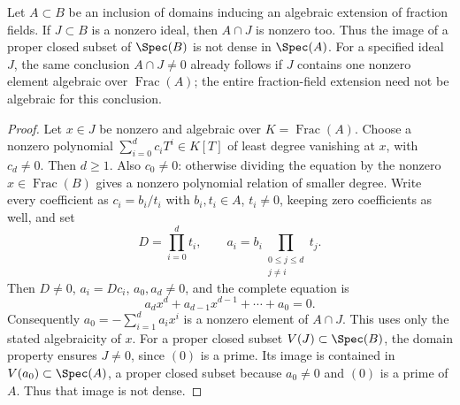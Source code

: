 \begin{lemma}
\label{editorial-source-lemma-intersection-not-zero}
Let $A \subset B$ be an inclusion of domains inducing an algebraic extension
of fraction fields. If $J \subset B$ is a nonzero ideal, then $A \cap J$
is nonzero too. Thus the image of a proper closed subset of $\Spec(B)$
is not dense in $\Spec(A)$.
For a specified ideal $J$, the same conclusion $A\cap J\ne0$ already
follows if $J$ contains one nonzero element algebraic over
$\operatorname{Frac}(A)$; the entire fraction-field extension need
not be algebraic for this conclusion.
\end{lemma}

\begin{proof}
Let $x\in J$ be nonzero and algebraic over $K=\operatorname{Frac}(A)$.
Choose a nonzero polynomial $\sum_{i=0}^dc_iT^i\in K[T]$ of least
degree vanishing at $x$, with $c_d\ne0$. Then $d\geq1$.
Also $c_0\ne0$: otherwise dividing the equation by the nonzero
$x\in\operatorname{Frac}(B)$ gives a nonzero polynomial relation
of smaller degree. Write every coefficient as $c_i=b_i/t_i$ with
$b_i,t_i\in A$, $t_i\ne0$, keeping zero coefficients as well, and set
$$
D=\prod_{i=0}^dt_i,\qquad
a_i=b_i\prod_{\substack{0\leq j\leq d\\j\ne i}}t_j.
$$
Then $D\ne0$, $a_i=Dc_i$, $a_0,a_d\ne0$, and the complete equation is
$$
a_dx^d+a_{d-1}x^{d-1}+\cdots+a_0=0.
$$
Consequently $a_0=-\sum_{i=1}^d a_ix^i$ is a nonzero element of
$A\cap J$. This uses only the stated algebraicity of $x$.
For a proper closed subset $V(J)\subset\Spec(B)$, the domain property
ensures $J\ne0$, since $(0)$ is a prime. Its image is contained in
$V(a_0)\subset\Spec(A)$, a proper closed subset because
$a_0\ne0$ and $(0)$ is a prime of $A$. Thus that image is not dense.
\end{proof}